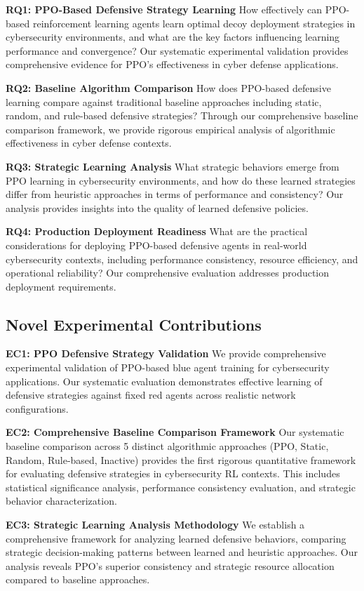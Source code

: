\documentclass[12pt,twoside]{article}
\theoremstyle{definition}
\theoremstyle{plain}
\begin{document}
\textbf{RQ1: PPO-Based Defensive Strategy Learning} 
How effectively can PPO-based reinforcement learning agents learn optimal decoy deployment strategies in cybersecurity environments, and what are the key factors influencing learning performance and convergence? Our systematic experimental validation provides comprehensive evidence for PPO's effectiveness in cyber defense applications.

\textbf{RQ2: Baseline Algorithm Comparison}
How does PPO-based defensive learning compare against traditional baseline approaches including static, random, and rule-based defensive strategies? Through our comprehensive baseline comparison framework, we provide rigorous empirical analysis of algorithmic effectiveness in cyber defense contexts.

\textbf{RQ3: Strategic Learning Analysis}
What strategic behaviors emerge from PPO learning in cybersecurity environments, and how do these learned strategies differ from heuristic approaches in terms of performance and consistency? Our analysis provides insights into the quality of learned defensive policies.

\textbf{RQ4: Production Deployment Readiness}
What are the practical considerations for deploying PPO-based defensive agents in real-world cybersecurity contexts, including performance consistency, resource efficiency, and operational reliability? Our comprehensive evaluation addresses production deployment requirements.

\subsection{Novel Experimental Contributions}

\textbf{EC1: PPO Defensive Strategy Validation}
We provide comprehensive experimental validation of PPO-based blue agent training for cybersecurity applications. Our systematic evaluation demonstrates effective learning of defensive strategies against fixed red agents across realistic network configurations.

\textbf{EC2: Comprehensive Baseline Comparison Framework}
Our systematic baseline comparison across 5 distinct algorithmic approaches (PPO, Static, Random, Rule-based, Inactive) provides the first rigorous quantitative framework for evaluating defensive strategies in cybersecurity RL contexts. This includes statistical significance analysis, performance consistency evaluation, and strategic behavior characterization.

\textbf{EC3: Strategic Learning Analysis Methodology}
We establish a comprehensive framework for analyzing learned defensive behaviors, comparing strategic decision-making patterns between learned and heuristic approaches. Our analysis reveals PPO's superior consistency and strategic resource allocation compared to baseline approaches.
\end{document}
